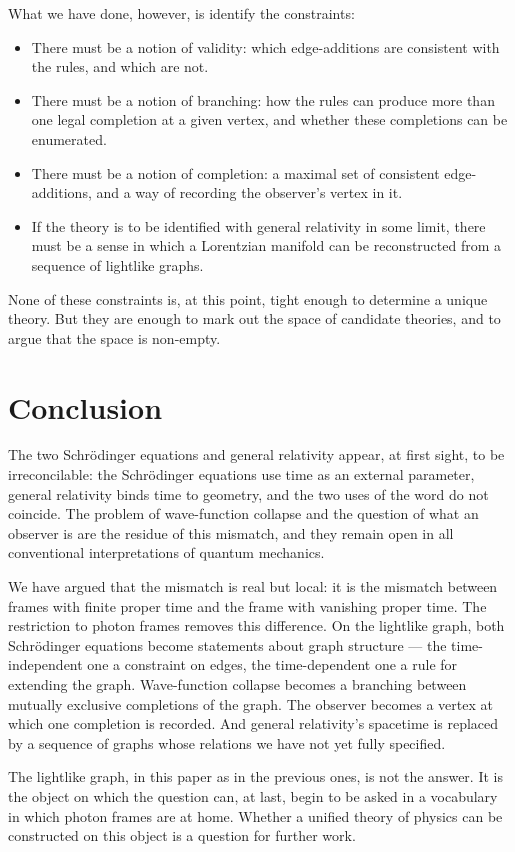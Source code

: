 \documentclass[11pt]{article}
\begin{document}
What we have done, however, is identify the constraints:
\begin{itemize}
    \item There must be a notion of validity: which edge-additions are consistent with the rules, and which are not.
    \item There must be a notion of branching: how the rules can produce more than one legal completion at a given vertex, and whether these completions can be enumerated.
    \item There must be a notion of completion: a maximal set of consistent edge-additions, and a way of recording the observer's vertex in it.
    \item If the theory is to be identified with general relativity in some limit, there must be a sense in which a Lorentzian manifold can be reconstructed from a sequence of lightlike graphs.
\end{itemize}
None of these constraints is, at this point, tight enough to determine a unique theory. But they are enough to mark out the space of candidate theories, and to argue that the space is non-empty.

\section{Conclusion}

The two Schr\"odinger equations and general relativity appear, at first sight, to be irreconcilable: the Schr\"odinger equations use time as an external parameter, general relativity binds time to geometry, and the two uses of the word do not coincide. The problem of wave-function collapse and the question of what an observer is are the residue of this mismatch, and they remain open in all conventional interpretations of quantum mechanics.

We have argued that the mismatch is real but local: it is the mismatch between frames with finite proper time and the frame with vanishing proper time. The restriction to photon frames removes this difference. On the lightlike graph, both Schr\"odinger equations become statements about graph structure --- the time-independent one a constraint on edges, the time-dependent one a rule for extending the graph. Wave-function collapse becomes a branching between mutually exclusive completions of the graph. The observer becomes a vertex at which one completion is recorded. And general relativity's spacetime is replaced by a sequence of graphs whose relations we have not yet fully specified.

The lightlike graph, in this paper as in the previous ones, is not the answer. It is the object on which the question can, at last, begin to be asked in a vocabulary in which photon frames are at home. Whether a unified theory of physics can be constructed on this object is a question for further work.
\end{document}
